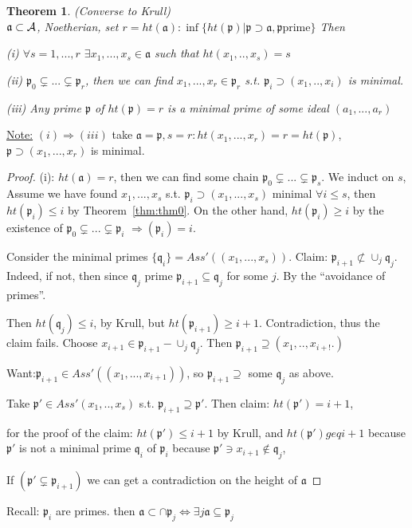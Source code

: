 \documentclass[11pt]{article}
\newtheorem{thm}{Theorem}[section]
\newcommand{\sca}{{\mathfrak a}}
\newcommand{\scp}{{\mathfrak p}}
\newcommand{\scq}{\mathfrak q}
\newcommand{\cala}{{\cal A}}
\newcommand{\Lrta}{\Longrightarrow}
\newcommand{\Llrta}{\Longleftrightarrow}
\begin{document}
\begin{thm}
(Converse to Krull)\\
$\sca\subset \cala$, Noetherian,  set $r=ht(\sca):\inf\{ht(\scp)|\scp\supset \sca,\scp\text{prime}\}$
Then 

(i) $\forall s=1,...,r$ $\exists x_1,...,x_s\in\sca$ such that $ht(x_1,..,x_s)=s$

(ii) $\scp_0\subsetneq ...\subsetneq \scp_r$, then we can find $x_1,...,x_r\in\scp_r$ s.t. $\scp_i\supset(x_1,..,x_i)$ is minimal.

(iii) Any prime $\scp$ of $ht(\scp)=r$ is a minimal prime of some ideal $(a_1,...,a_r)$
\end{thm}
\underline{Note:} $(i)\Lrta(iii)$ take $\sca=\scp,s=r:ht(x_1,...,x_r)=r=ht(\scp)$, $\scp\supset (x_1,...,x_r)$ is minimal. 

\begin{proof}
(i): $ht(\sca)=r$, then we can find some chain $\scp_0\subsetneq ...\subsetneq\scp_s $. We induct on $s$, Assume we have found $x_1,...,x_s$ s.t.
$\scp_i\supset(x_1,...,x_s)$ minimal $\forall i\leq s$, then $ht(\scp_i)\leq i$ by Theorem~\ref{thm:thm0}. On the other hand, $ht(\scp_i)\geq i$ by the existence of $\scp_0\subsetneq...\subsetneq \scp_i$ $\Lrta(\scp_i)=i$.

Consider the minimal primes $\{\scq_i\}=Ass'((x_1,...,x_s))$. Claim: $\scp_{i+1}\not \subset \cup_j\scq_j$. Indeed, if not, then since $\scq_j$ prime $\scp_{i+1}\subseteq \scq_j$ for some $j$. By the ``avoidance of primes''.

Then $ht(\scq_j)\leq i$, by Krull, but $ht(\scp_{i+1})\geq i+1$. Contradiction, thus the claim fails. Choose $x_{i+1}\in\scp_{i+1}-\cup_j\scq_j$. Then $\scp_{i+1}\supseteq(x_1,..,x_{i+!}.)$

Want:$\scp_{i+1}\in Ass'((x_1,...,x_{i+1}))$, so $\scp_{i+1}\supseteq $ some $\scq_j$ as above.

Take $\scp'\in Ass'(x_1,..,x_s)$ s.t. $\scp_{i+1}\supseteq\scp'.$ Then claim: $ht(\scp')=i+1$,

for the proof of the claim:
$ht(\scp')\leq i+1$ by Krull, and $ht(\scp')geq i+1$ because $\scp'$ is not a minimal prime $\scq_i$ of $\scp_i$ because $\scp'\ni x_{i+1}\notin\scq_j$,

If $(\scp'\subsetneq \scp_{i+1})$ we can get a contradiction on the height of $\sca$
\end{proof}

Recall: $\scp_i$ are primes. then $\sca\subset \cap\scp_j\Llrta \exists j \sca\subseteq \scp_j$
\end{document}
